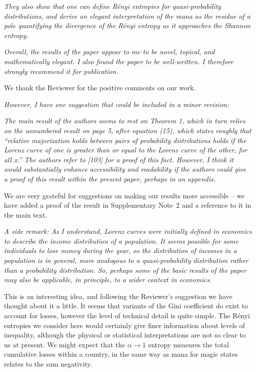 \documentclass[11pt]{letter}
\begin{document}
\textit{They also show that one can define R\'{e}nyi entropies for quasi-probability distributions, and derive an elegant interpretation of the mana as the residue of a pole quantifying the divergence of the R\'{e}nyi entropy as it approaches the Shannon entropy.}

\textit{Overall, the results of the paper appear to me to be novel, topical, and mathematically elegant. I also found the paper to be well-written. I therefore strongly recommend it for publication.}

We thank the Reviewer for the positive comments on our work.

\textit{However, I have one suggestion that could be included in a minor revision:}

\textit{The main result of the authors seems to rest on Theorem 1, which in turn relies on the unnumbered result on page 5, after equation (15), which states roughly that “relative majorization holds between pairs of probability distributions holds if the Lorenz curve of one is greater than or equal to the Lorenz curve of the other, for all x.” The authors refer to [103] for a proof of this fact. However, I think it would substantially enhance accessibility and readability if the authors could give a proof of this result within the present paper, perhaps in an appendix.}

We are very grateful for suggestions on making our results more accessible -- we have added a proof of the result in Supplementary Note~2 and a reference to it in the main text.

\textit{A side remark: As I understand, Lorenz curves were initially defined in economics to describe the income distribution of a population. It seems possible for some individuals to lose money during the year, so the distribution of incomes in a population is in general, more analogous to a quasi-probability distribution rather than a probability distribution. So, perhaps some of the basic results of the paper may also be applicable, in principle, to a wider context in economics.}

This is an interesting idea,  and following the Reviewer's suggestion we have thought about it a little.  It seems that variants of the Gini coefficient do exist to account for losses,  however the level of technical detail is quite simple.  The R\'{e}nyi entropies we consider here would certainly give finer information about levels of inequality,  although the physical or statistical interpretations are not so clear to us at present.  We might expect that the $\alpha \rightarrow 1$ entropy measures the total cumulative losses within a country,  in the same way as mana for magic states relates to the sum negativity.
\end{document}
